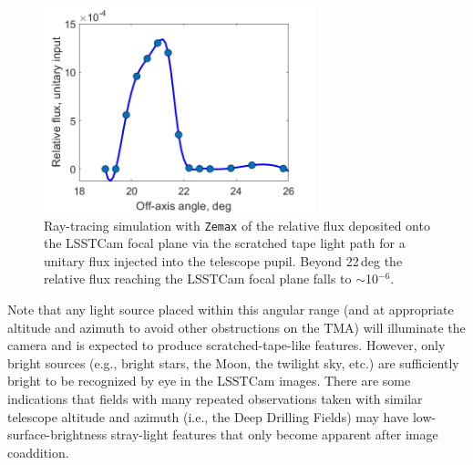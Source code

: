 \documentclass[SE,lsstdraft,authoryear,toc]{lsstdoc}
\begin{document}
\begin{figure}[!h]
    \centering
    \includegraphics[width=0.7\textwidth]{figures/scratched_tape_flux.png}
    \caption{\label{fig:st_flux}Ray-tracing simulation with \texttt{Zemax} of the relative flux deposited onto the LSSTCam focal plane via the scratched tape light path for a unitary flux injected into the telescope pupil. Beyond 22\,deg the relative flux reaching the LSSTCam focal plane falls to $\sim$10$^{-6}$.
}
\end{figure}

Note that any light source placed within this angular range (and at appropriate altitude and azimuth to avoid other obstructions on the TMA) will illuminate the camera and is expected to produce scratched-tape-like features. However, only bright sources (e.g., bright stars, the Moon, the twilight sky, etc.) are sufficiently bright to be recognized by eye in the LSSTCam images. There are some indications that fields with many repeated observations taken with similar telescope altitude and azimuth (i.e., the Deep Drilling Fields) may have low-surface-brightness stray-light features that only become apparent after image coaddition.
\end{document}
